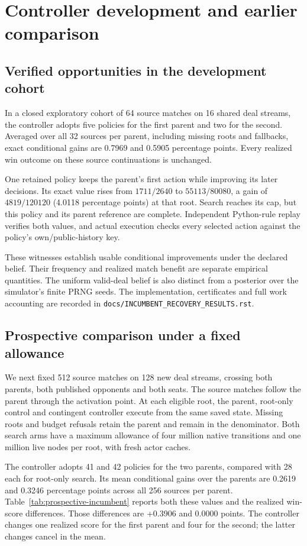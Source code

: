 \section{Controller development and earlier comparison}
\label{app:incumbent-development}
\subsection{Verified opportunities in the development cohort}
In a closed exploratory cohort of 64 source matches on 16 shared deal streams,
the controller adopts five policies for the first parent and two for the
second. Averaged over all 32 sources per parent, including missing roots and
fallbacks, exact conditional gains are 0.7969 and 0.5905 percentage points.
Every realized win outcome on these source continuations is unchanged.

One retained policy keeps the parent's first action while improving its later
decisions. Its exact value rises from $1711/2640$ to $55113/80080$, a gain of
$4819/120120$ (4.0118 percentage points) at that root. Search reaches its cap,
but this policy and its parent reference are complete. Independent Python-rule
replay verifies both values, and actual execution checks every selected action
against the policy's own/public-history key.

These witnesses establish usable conditional improvements under the declared
belief. Their frequency and realized match benefit are separate empirical
quantities. The uniform valid-deal belief is also distinct from a posterior over
the simulator's finite PRNG seeds. The implementation, certificates and full
work accounting are recorded in \texttt{docs/INCUMBENT\_RECOVERY\_RESULTS.rst}.

\subsection{Prospective comparison under a fixed allowance}
We next fixed 512 source matches on 128 new deal streams, crossing both parents,
both published opponents and both seats. The source matches follow the parent
through the activation point. At each eligible root, the parent, root-only
control and contingent controller execute from the same saved state. Missing
roots and budget refusals retain the parent and remain in the denominator.
Both search arms have a maximum allowance of four million native transitions
and one million live nodes per root, with fresh actor caches.

The controller adopts 41 and 42 policies for the two parents, compared with
28 each for root-only search. Its mean conditional gains over the parents are
0.2619 and 0.3246 percentage points across all 256 sources per parent.
Table~\ref{tab:prospective-incumbent} reports both these values and the realized
win-score differences. Those differences are +0.3906 and 0.0000 points.
The controller changes one realized score for the first parent and four for
the second; the latter changes cancel in the mean.

